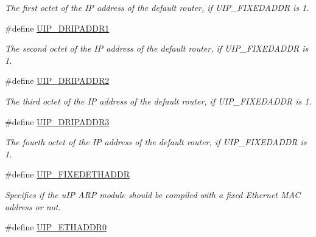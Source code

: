 \begin{CompactItemize}
\begin{CompactList}\small\item\em The first octet of the IP address of the default router, if UIP\_\-FIXEDADDR is 1. \item\end{CompactList}\item 
\hypertarget{a00071_g9c4ada901dd9399ed2824fe9a845b244}{
\#define \hyperlink{a00071_g9c4ada901dd9399ed2824fe9a845b244}{UIP\_\-DRIPADDR1}}
\label{a00071_g9c4ada901dd9399ed2824fe9a845b244}

\begin{CompactList}\small\item\em The second octet of the IP address of the default router, if UIP\_\-FIXEDADDR is 1. \item\end{CompactList}\item 
\hypertarget{a00071_g8c445bb2a232c1bc8df5967bba517954}{
\#define \hyperlink{a00071_g8c445bb2a232c1bc8df5967bba517954}{UIP\_\-DRIPADDR2}}
\label{a00071_g8c445bb2a232c1bc8df5967bba517954}

\begin{CompactList}\small\item\em The third octet of the IP address of the default router, if UIP\_\-FIXEDADDR is 1. \item\end{CompactList}\item 
\hypertarget{a00071_g64c7a13244c2aa57839de8c04697f41a}{
\#define \hyperlink{a00071_g64c7a13244c2aa57839de8c04697f41a}{UIP\_\-DRIPADDR3}}
\label{a00071_g64c7a13244c2aa57839de8c04697f41a}

\begin{CompactList}\small\item\em The fourth octet of the IP address of the default router, if UIP\_\-FIXEDADDR is 1. \item\end{CompactList}\item 
\#define \hyperlink{a00071_ge0f8cbeca9731af2171ffd37e79de893}{UIP\_\-FIXEDETHADDR}
\begin{CompactList}\small\item\em Specifies if the u\-IP ARP module should be compiled with a fixed Ethernet MAC address or not. \item\end{CompactList}\item 
\hypertarget{a00071_g7166cc625c5198d4d8608ad601d33930}{
\#define \hyperlink{a00071_g7166cc625c5198d4d8608ad601d33930}{UIP\_\-ETHADDR0}}
\label{a00071_g7166cc625c5198d4d8608ad601d33930}


\end{CompactItemize}
